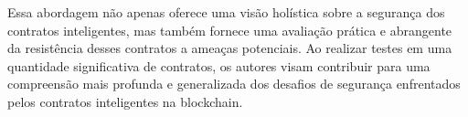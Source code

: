 Essa abordagem não apenas oferece uma visão holística sobre a segurança dos contratos inteligentes, mas também fornece uma avaliação prática e abrangente da resistência desses contratos a ameaças potenciais. Ao realizar testes em uma quantidade significativa de contratos, os autores visam contribuir para uma compreensão mais profunda e generalizada dos desafios de segurança enfrentados pelos contratos inteligentes na blockchain.

 










 





